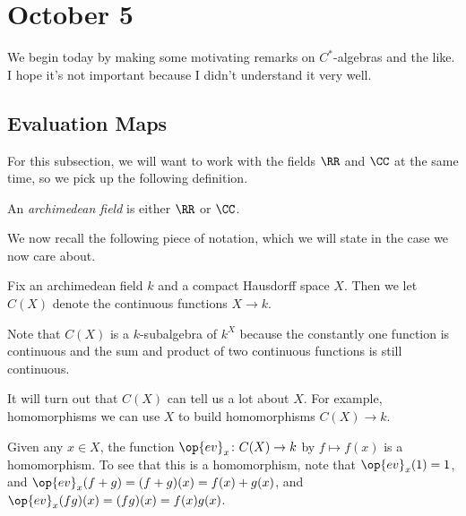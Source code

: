 \documentclass[../notes.tex]{subfiles}
\begin{document}
\section{October 5}

We begin today by making some motivating remarks on $C^*$-algebras and the like. I hope it's not important because I didn't understand it very well.

\subsection{Evaluation Maps}
For this subsection, we will want to work with the fields $\RR$ and $\CC$ at the same time, so we pick up the following definition.
\begin{definition}
	An \textit{archimedean field} is either $\RR$ or $\CC$.
\end{definition}
We now recall the following piece of notation, which we will state in the case we now care about.
\begin{notation}
	Fix an archimedean field $k$ and a compact Hausdorff space $X$. Then we let $C(X)$ denote the continuous functions $X\to k$.
\end{notation}
\begin{remark}
	Note that $C(X)$ is a $k$-subalgebra of $k^X$ because the constantly one function is continuous and the sum and product of two continuous functions is still continuous.
\end{remark}
It will turn out that $C(X)$ can tell us a lot about $X$. For example, homomorphisms we can use $X$ to build homomorphisms $C(X)\to k$.
\begin{example}
	Given any $x\in X$, the function $\op{ev}_x\colon C(X)\to k$ by $f\mapsto f(x)$ is a homomorphism. To see that this is a homomorphism, note that $\op{ev}_x(1)=1$, and $\op{ev}_x(f+g)=(f+g)(x)=f(x)+g(x)$, and $\op{ev}_x(fg)(x)=(fg)(x)=f(x)g(x)$.
\end{example}
\end{document}
